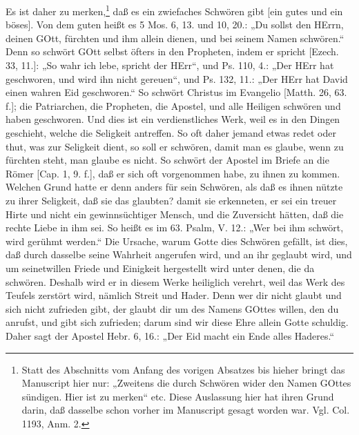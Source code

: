Es ist daher zu merken,\footnote{Statt des Abschnitts vom Anfang des vorigen Absatzes bis hieher bringt das Manuscript hier nur: „Zweitens die durch Schwören wider den Namen GOttes sündigen. Hier ist zu merken“ etc. Diese Auslassung hier hat ihren Grund darin, daß dasselbe schon vorher im Manuscript gesagt worden war. Vgl. Col. 1193, Anm. 2.} daß es ein zwiefaches
Schwören gibt [ein gutes und ein böses]. Von dem guten heißt es 5 Mos. 6, 13. und 10, 20.: „Du sollst den HErrn, deinen GOtt, fürchten und ihm allein dienen, und bei seinem Namen schwören.“ Denn so schwört GOtt selbst öfters in den Propheten, indem er spricht [Ezech. 33, 11.]: „So wahr ich lebe, spricht der HErr“, und Ps. 110, 4.: „Der HErr hat geschworen, und wird ihn nicht gereuen“, und Ps. 132, 11.: „Der HErr hat David einen wahren Eid geschworen.“ So schwört Christus im Evangelio [Matth. 26, 63. f.]; die Patriarchen, die Propheten, die Apostel, und alle Heiligen schwören und haben geschworen. Und dies ist ein verdienstliches Werk, weil es in den Dingen geschieht, welche die Seligkeit antreffen. So oft daher jemand etwas redet oder thut, was zur Seligkeit dient, so soll er schwören, damit man es glaube, wenn zu fürchten steht, man glaube es nicht. So schwört der Apostel im Briefe an die Römer [Cap. 1, 9. f.], daß er sich oft vorgenommen habe, zu ihnen zu kommen. Welchen Grund hatte er denn anders für sein Schwören, als daß es ihnen nützte zu ihrer Seligkeit, daß sie das glaubten? damit sie erkenneten, er sei ein treuer Hirte und nicht ein gewinnsüchtiger Mensch, und die Zuversicht hätten, daß die rechte Liebe in ihm sei. So heißt es im 63. Psalm, V. 12.: „Wer bei ihm schwört, wird gerühmt werden.“ Die Ursache, warum Gotte dies Schwören gefällt, ist dies, daß durch dasselbe seine Wahrheit angerufen wird, und an ihr geglaubt wird, und um seinetwillen Friede und Einigkeit hergestellt wird unter denen, die da schwören. Deshalb wird er in diesem Werke heiliglich verehrt, weil das Werk des Teufels zerstört wird, nämlich Streit und Hader. Denn wer dir nicht glaubt und sich nicht zufrieden gibt, der glaubt dir um des Namens GOttes willen, den du anrufst, und gibt sich zufrieden; darum sind wir diese Ehre allein Gotte schuldig. Daher sagt der Apostel Hebr. 6, 16.: „Der Eid macht ein Ende alles Haderes.“

